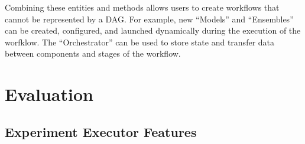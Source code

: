\documentclass[utf8]{FrontiersinVancouver} %
\begin{document}
Combining these entities and methods allows users to create workflows that
cannot be represented by a DAG. For example, new ``Models'' and ``Ensembles''
can be created, configured, and launched dynamically during the execution of the
worfklow. The ``Orchestrator'' can be used to store state and transfer data
between components and stages of the workflow.

\section{Evaluation}

\subsection{Experiment Executor Features}
\end{document}
